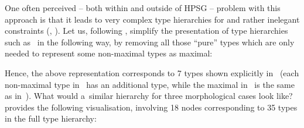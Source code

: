 \documentclass[output=paper]{langsci/langscibook}
\begin{document}
One often perceived – both within and outside of HPSG – problem with this approach is that it leads to very complex type hierarchies for  and rather inelegant constraints (\citealt[272]{sag:02}, \citealt[63–66]{dal:kin:sad:09}).  Let us, following \citealt{dani:01}, simplify the presentation of type hierarchies such as~ in the following way, by removing all those “pure” types which are only needed to represent some non-maximal types as maximal:
\begin{examples}
\item\label{daniels21} 
\end{examples}
Hence, the above representation corresponds to 7 types shown explicitly in~ (each non-maximal type in~ has an additional  type, while the maximal  in~ is the same as  in~).  What would a~similar hierarchy for three morphological cases look like?  \citealt[143]{dani:01} provides the following visualisation, involving 18 nodes corresponding to 35 types in the full type hierarchy:
\pagebreak
\end{document}
